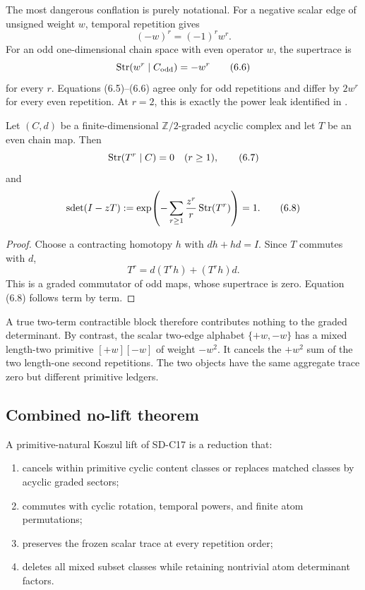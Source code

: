 The most dangerous conflation is purely notational.  For a negative scalar
edge of unsigned weight $w$, temporal repetition gives
\[
  (-w)^r=(-1)^rw^r.
  \tag{6.5}
\]
For an odd one-dimensional chain space with even operator $w$, the
supertrace is
\[
  \operatorname{Str}(w^r\mid C_{\mathrm{odd}})=-w^r
  \tag{6.6}
\]
for every $r$.  Equations (6.5)--(6.6) agree only for odd repetitions and
differ by $2w^r$ for every even repetition.  At $r=2$, this is exactly the
power leak identified in .

\begin{theorem}
\label{thm:acyclic}
Let $(C,d)$ be a finite-dimensional $\mathbb Z/2$-graded acyclic complex and
let $T$ be an even chain map.  Then
\[
  \operatorname{Str}(T^r\mid C)=0\quad(r\ge1),
  \tag{6.7}
\]
and
\[
  \operatorname{sdet}(I-zT)
  :=\exp\!\left(-\sum_{r\ge1}\frac{z^r}{r}\operatorname{Str}(T^r)\right)=1.
  \tag{6.8}
\]
\end{theorem}

\begin{proof}
Choose a contracting homotopy $h$ with $dh+hd=I$.  Since $T$ commutes with
$d$,
\[
  T^r=d(T^rh)+(T^rh)d.
  \tag{6.9}
\]
This is a graded commutator of odd maps, whose supertrace is zero.  Equation
(6.8) follows term by term.
\end{proof}

A true two-term contractible block therefore contributes nothing to the
graded determinant.  By contrast, the scalar two-edge alphabet
$\{+w,-w\}$ has a mixed length-two primitive $[+w][-w]$ of weight $-w^2$.
It cancels the $+w^2$ sum of the two length-one second repetitions.  The two
objects have the same aggregate trace zero but different primitive ledgers.

\subsection{Combined no-lift theorem}

\begin{definition}
\label{def:lift}
A primitive-natural Koszul lift of SD-C17 is a reduction that:

\begin{enumerate}
\item cancels within primitive cyclic content classes or replaces matched
  classes by acyclic graded sectors;
\item commutes with cyclic rotation, temporal powers, and finite atom
  permutations;
\item preserves the frozen scalar trace at every repetition order;
\item deletes all mixed subset classes while retaining nontrivial atom
  determinant factors.
\end{enumerate}
\end{definition}

